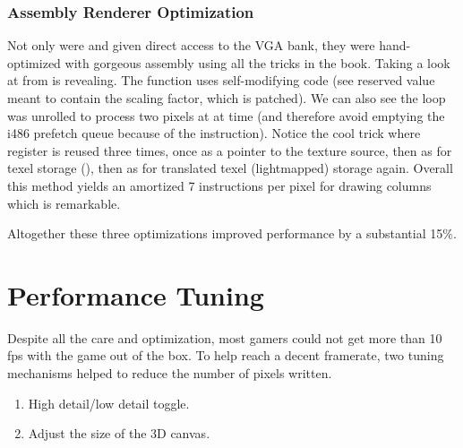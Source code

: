 \vspace{-10pt}
\subsubsection{Assembly Renderer Optimization}
Not only were  and  given direct access to the VGA bank, they were hand-optimized with gorgeous assembly using all the tricks in the book. Taking a look at  from  is revealing. The function uses self-modifying code (see reserved value  meant to contain the scaling factor, which is patched). We can also see the loop was unrolled to process two pixels at at time (and therefore avoid emptying the i486 prefetch queue because of the  instruction). Notice the cool trick where register  is reused three times, once as a pointer to the texture source, then as  for texel storage (), then as  for translated texel (lightmapped) storage again. Overall this method yields an amortized 7 instructions per pixel for drawing columns which is remarkable.\\
\par
Altogether these three optimizations improved performance by a substantial 15\%.







\vspace{-1.25cm}
\section{Performance Tuning}
Despite all the care and optimization, most gamers could not get more than 10 fps with the game out of the box. To help reach a decent framerate, two tuning mechanisms helped to reduce the number of pixels written.
\begin{enumerate}
\item High detail/low detail toggle.
\item Adjust the size of the 3D canvas.
\end{enumerate}
\par
{}\\
\par



